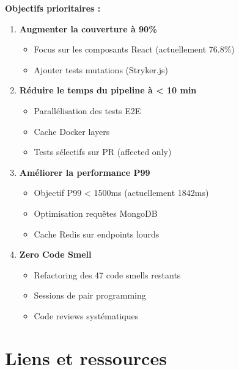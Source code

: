 \begin{tcolorbox}[colback=yellow!5!white,colframe=yellow!60!black,title=\textbf{Plan d'amélioration Q1 2025}]
\textbf{Objectifs prioritaires :}
\begin{enumerate}
    \item \textbf{Augmenter la couverture à 90\%} 
        \begin{itemize}
            \item Focus sur les composants React (actuellement 76.8\%)
            \item Ajouter tests mutations (Stryker.js)
        \end{itemize}
    
    \item \textbf{Réduire le temps du pipeline à < 10 min}
        \begin{itemize}
            \item Parallélisation des tests E2E
            \item Cache Docker layers
            \item Tests sélectifs sur PR (affected only)
        \end{itemize}
    
    \item \textbf{Améliorer la performance P99}
        \begin{itemize}
            \item Objectif P99 < 1500ms (actuellement 1842ms)
            \item Optimisation requêtes MongoDB
            \item Cache Redis sur endpoints lourds
        \end{itemize}
    
    \item \textbf{Zero Code Smell}
        \begin{itemize}
            \item Refactoring des 47 code smells restants
            \item Sessions de pair programming
            \item Code reviews systématiques
        \end{itemize}
\end{enumerate}
\end{tcolorbox}

\section{Liens et ressources}

